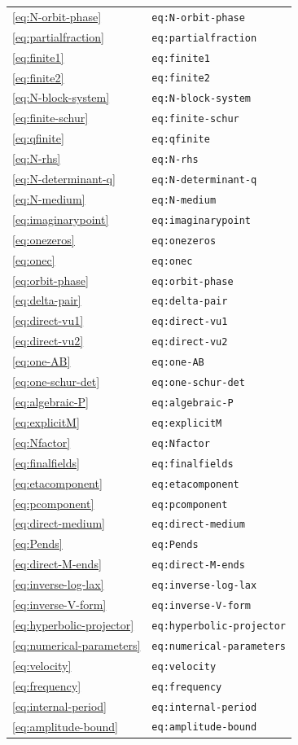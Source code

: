 \begin{longtable}{p{}p{}}
\eqref{eq:N-orbit-phase} & \texttt{eq:N-orbit-phase}\\
\eqref{eq:partialfraction} & \texttt{eq:partialfraction}\\
\eqref{eq:finite1} & \texttt{eq:finite1}\\
\eqref{eq:finite2} & \texttt{eq:finite2}\\
\eqref{eq:N-block-system} & \texttt{eq:N-block-system}\\
\eqref{eq:finite-schur} & \texttt{eq:finite-schur}\\
\eqref{eq:qfinite} & \texttt{eq:qfinite}\\
\eqref{eq:N-rhs} & \texttt{eq:N-rhs}\\
\eqref{eq:N-determinant-q} & \texttt{eq:N-determinant-q}\\
\eqref{eq:N-medium} & \texttt{eq:N-medium}\\
\eqref{eq:imaginarypoint} & \texttt{eq:imaginarypoint}\\
\eqref{eq:onezeros} & \texttt{eq:onezeros}\\
\eqref{eq:onec} & \texttt{eq:onec}\\
\eqref{eq:orbit-phase} & \texttt{eq:orbit-phase}\\
\eqref{eq:delta-pair} & \texttt{eq:delta-pair}\\
\eqref{eq:direct-vu1} & \texttt{eq:direct-vu1}\\
\eqref{eq:direct-vu2} & \texttt{eq:direct-vu2}\\
\eqref{eq:one-AB} & \texttt{eq:one-AB}\\
\eqref{eq:one-schur-det} & \texttt{eq:one-schur-det}\\
\eqref{eq:algebraic-P} & \texttt{eq:algebraic-P}\\
\eqref{eq:explicitM} & \texttt{eq:explicitM}\\
\eqref{eq:Nfactor} & \texttt{eq:Nfactor}\\
\eqref{eq:finalfields} & \texttt{eq:finalfields}\\
\eqref{eq:etacomponent} & \texttt{eq:etacomponent}\\
\eqref{eq:pcomponent} & \texttt{eq:pcomponent}\\
\eqref{eq:direct-medium} & \texttt{eq:direct-medium}\\
\eqref{eq:Pends} & \texttt{eq:Pends}\\
\eqref{eq:direct-M-ends} & \texttt{eq:direct-M-ends}\\
\eqref{eq:inverse-log-lax} & \texttt{eq:inverse-log-lax}\\
\eqref{eq:inverse-V-form} & \texttt{eq:inverse-V-form}\\
\eqref{eq:hyperbolic-projector} & \texttt{eq:hyperbolic-projector}\\
\eqref{eq:numerical-parameters} & \texttt{eq:numerical-parameters}\\
\eqref{eq:velocity} & \texttt{eq:velocity}\\
\eqref{eq:frequency} & \texttt{eq:frequency}\\
\eqref{eq:internal-period} & \texttt{eq:internal-period}\\
\eqref{eq:amplitude-bound} & \texttt{eq:amplitude-bound}\\
\bottomrule\end{longtable}
\endgroup
